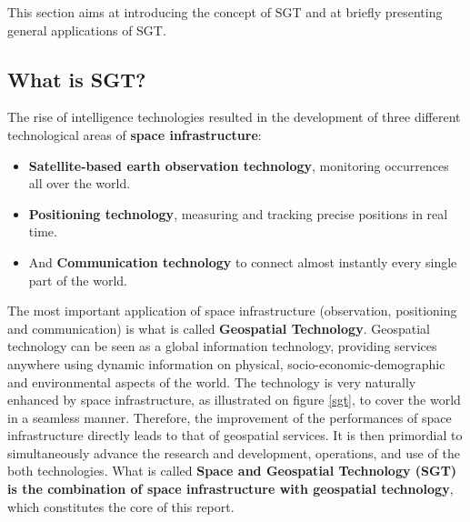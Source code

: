 \tab This section aims at introducing the concept of SGT and at briefly presenting general applications of SGT.

\subsection{What is SGT?} \label{wi_sgt}

The rise of intelligence technologies resulted in the development of three different technological areas of \textbf{space infrastructure}: 

\begin{itemize}

\item \textbf{Satellite-based earth observation technology}, monitoring occurrences all over the world.

\item \textbf{Positioning technology}, measuring and tracking precise positions in real time.

\item And \textbf{Communication technology} to connect almost instantly every single part of the world.

\end{itemize}

The most important application of space infrastructure (observation, positioning and communication) is what is called \textbf{Geospatial Technology}. Geospatial technology can be seen as a global information technology, providing services anywhere using dynamic information on physical, socio-economic-demographic and environmental aspects of the world. The technology is very naturally enhanced by space infrastructure, as illustrated on figure \ref{sgt}, to cover the world in a seamless manner. Therefore, the improvement of the performances of space infrastructure directly leads to that of geospatial services. It is then primordial to simultaneously advance the research and development, operations, and use of the both technologies. What is called \textbf{Space and Geospatial Technology (SGT) is the combination of space infrastructure with geospatial technology}, which constitutes the core of this report.
 
